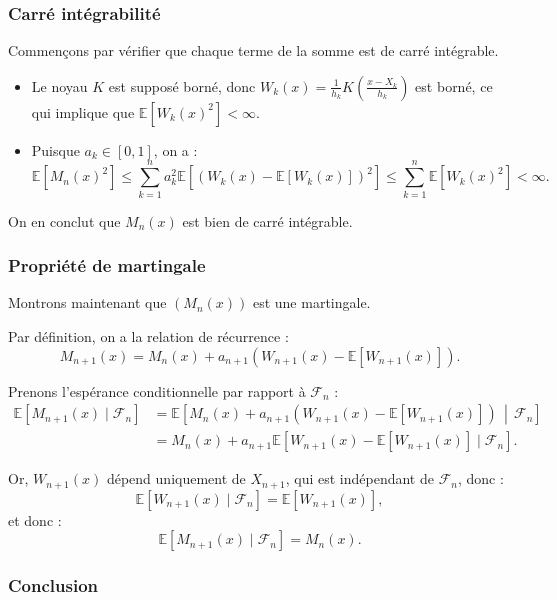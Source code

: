 \documentclass[12pt]{article}
\begin{document}
\subsubsection*{Carré intégrabilité}

Commençons par vérifier que chaque terme de la somme est de carré intégrable.

\begin{itemize}
    \item Le noyau \( K \) est supposé borné, donc \( W_k(x) = \frac{1}{h_k} K\left( \frac{x - X_k}{h_k} \right) \) est borné, ce qui implique que \( \mathbb{E}[W_k(x)^2] < \infty \).

    \item Puisque \( a_k \in [0,1] \), on a :
    \[
    \mathbb{E}[M_n(x)^2] \leq \sum_{k=1}^n a_k^2 \mathbb{E}\left[ \left(W_k(x) - \mathbb{E}[W_k(x)] \right)^2 \right] \leq \sum_{k=1}^n \mathbb{E}[W_k(x)^2] < \infty.
    \]
\end{itemize}

On en conclut que \( M_n(x) \) est bien de carré intégrable.

\subsubsection*{Propriété de martingale}

Montrons maintenant que \( (M_n(x)) \) est une martingale.

Par définition, on a la relation de récurrence :
\[
M_{n+1}(x) = M_n(x) + a_{n+1} \left( W_{n+1}(x) - \mathbb{E}[W_{n+1}(x)] \right).
\]

Prenons l'espérance conditionnelle par rapport à \( \mathcal{F}_n \) :
\begin{align*}
\mathbb{E}[M_{n+1}(x) \mid \mathcal{F}_n] 
&= \mathbb{E} \left[ M_n(x) + a_{n+1} \left( W_{n+1}(x) - \mathbb{E}[W_{n+1}(x)] \right) \,\middle|\, \mathcal{F}_n \right] \\
&= M_n(x) + a_{n+1} \mathbb{E}\left[ W_{n+1}(x) - \mathbb{E}[W_{n+1}(x)] \mid \mathcal{F}_n \right].
\end{align*}

Or, \( W_{n+1}(x) \) dépend uniquement de \( X_{n+1} \), qui est indépendant de \( \mathcal{F}_n \), donc :
\[
\mathbb{E}[W_{n+1}(x) \mid \mathcal{F}_n] = \mathbb{E}[W_{n+1}(x)],
\]
et donc :
\[
\mathbb{E}[M_{n+1}(x) \mid \mathcal{F}_n] = M_n(x).
\]

\subsubsection*{Conclusion}
\end{document}
